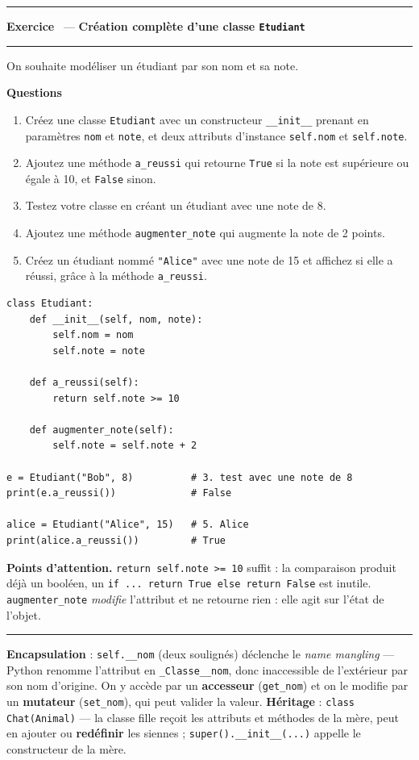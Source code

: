 \documentclass[10pt,a4paper]{article}
\newif\ifcorrige
\newcommand{\py}[1]{\texttt{#1}}
\newcounter{exo}
\newcommand{\exo}[1]{%
  \stepcounter{exo}\par\vspace{4pt}
  \ifcorrige\else\noindent\minipage{\textwidth}\fi
  \noindent\textcolor{qbar}{\rule{2.5pt}{10pt}}\hspace{4pt}%
  \textbf{\color{qbar}Exercice \theexo}\ --- \textbf{#1}%
  \par\nobreak\vspace{-3pt}\noindent\textcolor{qbar!35}{\rule{\textwidth}{0.6pt}}%
  \par\nobreak\vspace{1pt}}
\newenvironment{qbloclarge}
  {\par\vspace{2pt}\noindent\textbf{\small Questions}\par\nobreak\begin{enumerate}[leftmargin=*,nosep,label=\arabic*.]}
  {\end{enumerate}}
\newlength{\zoneadj}\setlength{\zoneadj}{0pt}
\newcommand{\zone}[1][4cm]{%
  \ifcorrige\else
    \par\vspace{2pt}\noindent
    \begin{tcolorbox}[colback=white,colframe=black!45,boxrule=0.5pt,arc=1pt,height={\dimexpr#1-\zoneadj\relax},
      left=4pt,right=4pt,top=2pt,bottom=2pt,
      title={\scriptsize\itshape Réponses},coltitle=black!55,fonttitle=\itshape,
      detach title,before upper={\tcbtitle\par}]\end{tcolorbox}%
    \endminipage\par
  \fi}
\newenvironment{solution}
  {\ifcorrige
     \begin{tcolorbox}[enhanced,breakable,colback=corrbg,colframe=corr,boxrule=0.6pt,arc=1pt,
       left=5pt,right=5pt,top=3pt,bottom=3pt,fontupper=\small,
       title={Corrigé},coltitle=corr,fonttitle=\bfseries\small,detach title,
       before upper={\tcbtitle\par\smallskip}]%
   \else
     \setbox0\vbox\bgroup
   \fi}
  {\ifcorrige\end{tcolorbox}\else\egroup\fi}
\newcommand{\partie}[1]{%
  \Needspace{7cm}\par\medskip\noindent{\large\bfseries\color{qbar}#1}%
  \par\nobreak\vspace{-2pt}\noindent\textcolor{qbar}{\rule{\textwidth}{1pt}}\par\nobreak\smallskip}
\begin{document}
\exo{Création complète d'une classe \py{Etudiant}}
On souhaite modéliser un étudiant par son nom et sa note.
\begin{qbloclarge}
  \item Créez une classe \py{Etudiant} avec un constructeur \py{__init__} prenant en paramètres
    \py{nom} et \py{note}, et deux attributs d'instance \py{self.nom} et \py{self.note}.
  \item Ajoutez une méthode \py{a_reussi} qui retourne \py{True} si la note est supérieure ou égale
    à 10, et \py{False} sinon.
  \item Testez votre classe en créant un étudiant avec une note de 8.
  \item Ajoutez une méthode \py{augmenter_note} qui augmente la note de 2 points.
  \item Créez un étudiant nommé \py{"Alice"} avec une note de 15 et affichez si elle a réussi,
    grâce à la méthode \py{a_reussi}.
\end{qbloclarge}
\zone[8.7cm]
\begin{solution}
\begin{lstlisting}
class Etudiant:
    def __init__(self, nom, note):
        self.nom = nom
        self.note = note

    def a_reussi(self):
        return self.note >= 10

    def augmenter_note(self):
        self.note = self.note + 2

e = Etudiant("Bob", 8)          # 3. test avec une note de 8
print(e.a_reussi())             # False

alice = Etudiant("Alice", 15)   # 5. Alice
print(alice.a_reussi())         # True
\end{lstlisting}
\textbf{Points d'attention.} \py{return self.note >= 10} suffit : la comparaison produit déjà un
booléen, un \py{if ... return True else return False} est inutile. \py{augmenter_note} \emph{modifie}
l'attribut et ne retourne rien : elle agit sur l'état de l'objet.
\end{solution}

\partie{Partie B --- Encapsulation et héritage}

\begin{memo}[Mémo]
\textbf{Encapsulation} : \py{self.__nom} (deux soulignés) déclenche le \emph{name mangling} — Python
renomme l'attribut en \py{_Classe__nom}, donc inaccessible de l'extérieur par son nom d'origine. On y
accède par un \textbf{accesseur} (\py{get_nom}) et on le modifie par un \textbf{mutateur}
(\py{set_nom}), qui peut valider la valeur.
\textbf{Héritage} : \py{class Chat(Animal)} — la classe fille reçoit les attributs et méthodes de la
mère, peut en ajouter ou \textbf{redéfinir} les siennes ; \py{super().__init__(...)} appelle le
constructeur de la mère.
\end{memo}
\end{document}
